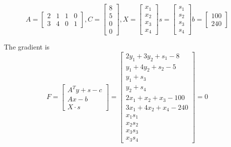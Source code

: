\documentclass[a4paper,10pt]{article}
\begin{document}
\begin{enumerate}
{\[
    A = \begin{bmatrix}
        2 & 1 & 1 & 0 \\ 3 & 4 & 0 & 1
    \end{bmatrix},
    C = \begin{bmatrix} 8 \\ 5 \\ 0 \\ 0 \end{bmatrix}, 
    X = \begin{bmatrix} x_1 \\ x_2 \\ x_3 \\ x_4 \end{bmatrix}
    s = \begin{bmatrix} s_1 \\ s_2 \\ s_3 \\ s_4 \end{bmatrix}
    b = \begin{bmatrix} 100 \\ 240 \end{bmatrix}
\]

The gradient is
\[
    F = \begin{bmatrix} A^T y + s -c \\ Ax - b \\ X \cdot s \end{bmatrix} = \begin{bmatrix} 2y_1 + 3y_2 + s_1 - 8 \\ y_1 + 4y_2 + s_2 - 5 \\ y_1 + s_3 \\ y_2 + s_4 \\ 2x_1 + x_2 + x_3 - 100 \\ 3x_1 + 4x_2 + x_4 - 240 \\ x_1 s_1 \\ x_2 s_2 \\ x_3 s_3 \\ x_3 s_4 \end{bmatrix} = 0
\]

}
\end{enumerate}
\end{document}
